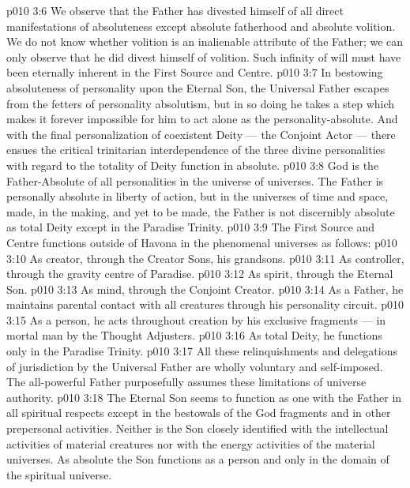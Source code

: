 \vs p010 3:6 We observe that the Father has divested himself of all direct manifestations of absoluteness except absolute fatherhood and absolute volition. We do not know whether volition is an inalienable attribute of the Father; we can only observe that he did  divest himself of volition. Such infinity of will must have been eternally inherent in the First Source and Centre.
\vs p010 3:7 In bestowing absoluteness of personality upon the Eternal Son, the Universal Father escapes from the fetters of personality absolutism, but in so doing he takes a step which makes it forever impossible for him to act alone as the personality\hyp{}absolute. And with the final personalization of coexistent Deity --- the Conjoint Actor --- there ensues the critical trinitarian interdependence of the three divine personalities with regard to the totality of Deity function in absolute.
\vs p010 3:8 God is the Father\hyp{}Absolute of all personalities in the universe of universes. The Father is personally absolute in liberty of action, but in the universes of time and space, made, in the making, and yet to be made, the Father is not discernibly absolute as total Deity except in the Paradise Trinity.
\vs p010 3:9 \pc The First Source and Centre functions outside of Havona in the phenomenal universes as follows:
\vs p010 3:10 \bibnobreakspace As creator, through the Creator Sons, his grandsons.
\vs p010 3:11 \bibnobreakspace As controller, through the gravity centre of Paradise.
\vs p010 3:12 \bibnobreakspace As spirit, through the Eternal Son.
\vs p010 3:13 \bibnobreakspace As mind, through the Conjoint Creator.
\vs p010 3:14 \bibnobreakspace As a Father, he maintains parental contact with all creatures through his personality circuit.
\vs p010 3:15 \bibnobreakspace As a person, he acts  throughout creation by his exclusive fragments --- in mortal man by the Thought Adjusters.
\vs p010 3:16 \bibnobreakspace As total Deity, he functions only in the Paradise Trinity.
\vs p010 3:17 \pc All these relinquishments and delegations of jurisdiction by the Universal Father are wholly voluntary and self\hyp{}imposed. The all\hyp{}powerful Father purposefully assumes these limitations of universe authority.
\vs p010 3:18 \pc The Eternal Son seems to function as one with the Father in all spiritual respects except in the bestowals of the God fragments and in other prepersonal activities. Neither is the Son closely identified with the intellectual activities of material creatures nor with the energy activities of the material universes. As absolute the Son functions as a person and only in the domain of the spiritual universe.
